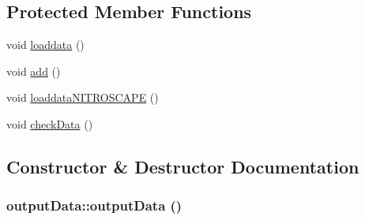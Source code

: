 \subsection*{Protected Member Functions}
\begin{DoxyCompactItemize}
\item 
void \hyperlink{classoutput_data_af0a91350b97125b3ef68384deb7942e3}{loaddata} ()
\item 
void \hyperlink{classoutput_data_a63e0c533fd9ff48a970f8207ed3047cb}{add} ()
\item 
void \hyperlink{classoutput_data_a1289c4709faed89a0b65c7c3f07970f1}{loaddataNITROSCAPE} ()
\item 
void \hyperlink{classoutput_data_a0826d605088812ac5f4bba01ea601117}{checkData} ()
\end{DoxyCompactItemize}


\subsection{Constructor \& Destructor Documentation}
\hypertarget{classoutput_data_a47c95333a048b1978d7cc4871d7c5230}{
\subsubsection[{outputData}]{\setlength{\rightskip}{0pt plus 5cm}outputData::outputData ()}}
\label{classoutput_data_a47c95333a048b1978d7cc4871d7c5230}


